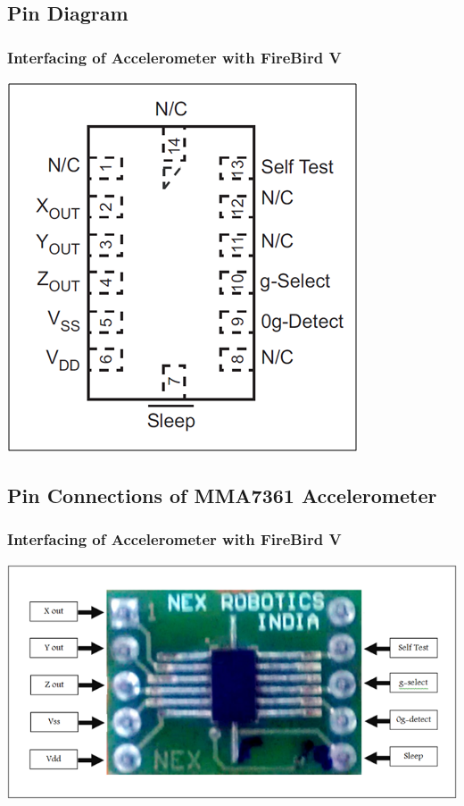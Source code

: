\documentclass[table,10pt,red]{beamer}	%
\begin{document}
\subsection{Pin Diagram} 
\begin{frame}
	\frametitle{Interfacing of Accelerometer with FireBird V}
\pause
\begin{minipage}[c]{0.60\textwidth}
\hspace*{22mm}\includegraphics[width=\linewidth]{acc1.png}
		\end{minipage}
		
\end{frame}
\subsection{Pin Connections of MMA7361 Accelerometer} 
\begin{frame}
	\frametitle{Interfacing of Accelerometer with FireBird V}
\pause
\includegraphics[width=\linewidth]{acc2.png}
		
\end{frame}
\end{document}
